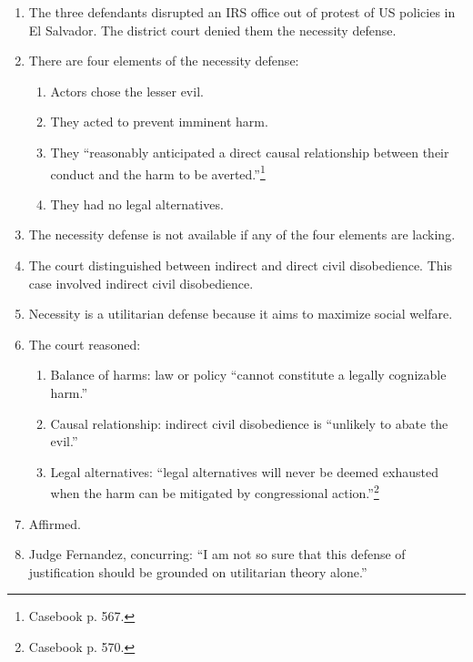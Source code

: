\begin{enumerate}
    \item The three defendants disrupted an IRS office out of protest of US 
    policies in El Salvador. The district court denied them the necessity 
    defense.
    \item There are four elements of the necessity defense:
    \begin{enumerate}
        \item Actors chose the lesser evil.
        \item They acted to prevent imminent harm.
        \item They ``reasonably anticipated a direct causal relationship 
        between their conduct and the harm to be averted.''\footnote{Casebook 
        p. 567.}
        \item They had no legal alternatives.
    \end{enumerate}
    \item The necessity defense is not available if any of the four elements 
    are lacking.
    \item The court distinguished between indirect and direct civil 
    disobedience. This case involved indirect civil disobedience.
    \item Necessity is a utilitarian defense because it aims to maximize 
    social welfare.
    \item The court reasoned:
    \begin{enumerate}
        \item Balance of harms: law or policy ``cannot constitute a legally 
        cognizable harm.''
        \item Causal relationship: indirect civil disobedience is ``unlikely 
        to abate the evil.''
        \item Legal alternatives: ``legal alternatives will never be deemed 
        exhausted when the harm can be mitigated by congressional 
        action.''\footnote{Casebook p. 570.}
    \end{enumerate}
    \item Affirmed.
    \item Judge Fernandez, concurring: ``I am not so sure that this defense of 
    justification should be grounded on utilitarian theory alone.''
\end{enumerate}

